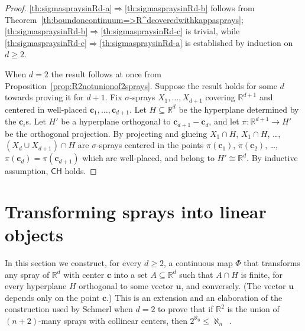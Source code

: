 \documentclass[12pt]{amsart}
\newcommand{\CH}{{\mathsf{CH}}}	%
\newcommand{\R}{\mathbb{R}}	%
\newcommand{\IMPLIES}{\Rightarrow }
\theoremstyle{plain}
\theoremstyle{definition}
\theoremstyle{remark}
\begin{document}
\begin{proof}
\ref{th:sigmaspraysinRd-a}\( \IMPLIES \)\ref{th:sigmaspraysinRd-b} follows from Theorem~\ref{th:boundoncontinuum=>R^dcoveredwithkappasprays}; \ref{th:sigmaspraysinRd-b}\( \IMPLIES \)\ref{th:sigmaspraysinRd-c} is trivial, while \ref{th:sigmaspraysinRd-c}\( \IMPLIES \)\ref{th:sigmaspraysinRd-a} is established by induction on \( d \geq 2 \).

When \( d = 2 \) the result follows at once from Proposition~\ref{prop:R2notunionof2sprays}.
Suppose the result holds for some \( d \) towards proving it for \( d + 1 \).
Fix \( \sigma \)-sprays \( X_1 , \dots , X_{ d + 1 } \) covering \( \R^{ d + 1 } \) and centered in well-placed \( \mathbf{c}_1 , \dots , \mathbf{c}_{ d + 1 } \).
Let \( H \subseteq \R^d \) be the hyperplane determined by the \( \mathbf{c}_i \)s.
Let \( H' \) be a hyperplane orthogonal to \( \mathbf{c}_{d + 1} - \mathbf{c}_d \), and let \( \pi \colon \R^{ d + 1} \to H ' \) be the orthogonal projection.
By projecting and glueing \( X_1 \cap H \), \( X_1 \cap H \), \ldots , \( ( X_d \cup X_{ d + 1} ) \cap H \) are \( \sigma \)-sprays centered in the points \( \pi ( \mathbf{c}_1 ) \), \( \pi ( \mathbf{c}_2 ) \), \ldots , \( \pi ( \mathbf{c}_d ) = \pi ( \mathbf{c}_{ d + 1 } ) \) which are well-placed, and belong to \( H' \cong \R^d \).
By inductive assumption, \( \CH \) holds.
\end{proof}


\section{Transforming sprays into linear objects}\label{sec:Transforming-sprays-into-linear-objects}
In this section we construct, for every \( d \geq 2 \), a continuous map \( \Phi \) that transforms any spray of \( \R^d \) with center \( \mathbf{c} \) into a set \( A \subseteq \R^d \) such that \( A \cap H \) is finite, for every hyperplane \( H \) orthogonal to some vector \( \mathbf{u} \), and conversely.
(The vector \( \mathbf{u} \) depends only on the point \( \mathbf{c} \).)
This is an extension and an elaboration of the construction used by Schmerl when \( d = 2 \) to prove that if \( \R^2 \) is the union of \( ( n + 2 ) \)-many sprays with collinear centers, then \( 2^{\aleph_0} \leq \aleph_n \)~\cite[Theorem 7]{Schmerl:2010nr}.
\end{document}
